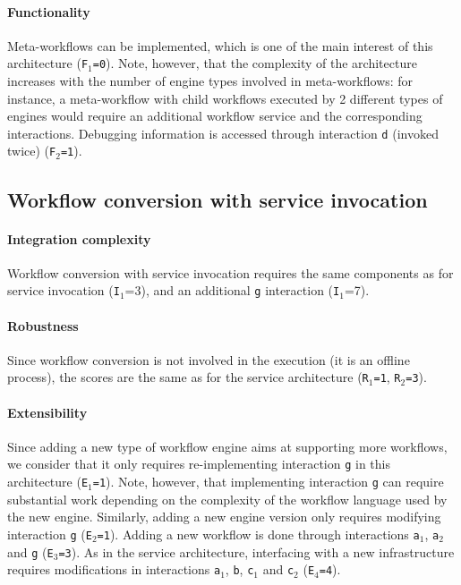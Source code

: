 \documentclass[preprint,3p,twocolumn]{elsarticle}
\newcommand{\correction}[1]{\color{blue}#1\color{black}\xspace}
\begin{document}
\paragraph{\correction{Functionality}}
Meta-workflows can be implemented, which is one of the main interest
of this architecture (\texttt{\correction{F}$_1$=0}). Note, however, that the
complexity of the architecture increases with the number of engine
types involved in meta-workflows: for instance, a meta-workflow with
child workflows executed by 2 different types of engines would require
an additional workflow service and the corresponding interactions.
Debugging information is accessed through interaction \texttt{d}
(invoked twice) (\texttt{\correction{F}$_2$=1}).

\subsection{Workflow conversion with service invocation}

\paragraph{Integration complexity} Workflow conversion with service invocation
requires the same components as for service invocation
(\texttt{I$_1$}=3), and an additional \texttt{g} interaction (\texttt{I$_1$}=7).

\paragraph{Robustness} Since workflow conversion is not involved in
the execution (it is an offline process), the scores are the same as for the
service architecture (\texttt{R$_1$=1}, \texttt{R$_2$=3}).

\paragraph{Extensibility} Since adding a new type of workflow engine
aims at supporting more workflows, we consider that it only requires
re-implementing interaction \texttt{g} in this architecture  (\texttt{E$_1$=1}). Note,
however, that implementing interaction \texttt{g} can require
substantial work depending on the complexity of the workflow language used by
the new engine. Similarly, adding a
new engine version only requires modifying interaction \texttt{g}
(\texttt{E$_2$=1}).  Adding a new workflow is done through
interactions \texttt{a$_1$}, \texttt{a$_2$} and \texttt{g} (\texttt{E$_3$=3}). As in the
service architecture, interfacing with a new infrastructure requires
modifications in interactions \texttt{a$_1$}, \texttt{b}, \texttt{c$_1$}
and \texttt{c$_2$} (\texttt{E$_4$=4}).
\end{document}
